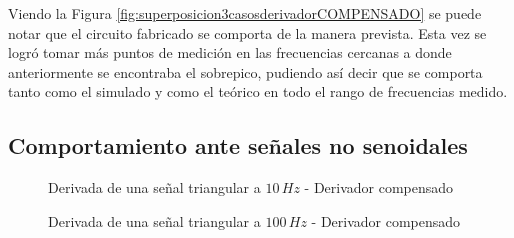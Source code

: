 \documentclass[11pt, a4paper]{article}
\begin{document}
Viendo la Figura \ref{fig:superposicion3casosderivadorCOMPENSADO} se puede notar que el circuito fabricado se comporta de la manera prevista. Esta vez se logró tomar más puntos de medición en las frecuencias cercanas a donde anteriormente se encontraba el sobrepico, pudiendo así decir que se comporta tanto como el simulado y como el teórico en todo el rango de frecuencias medido.

\subsection{Comportamiento ante señales no senoidales}

\begin{figure}[H]
	\begin{center}
		\caption{Derivada de una señal triangular a $10 \,Hz$ - Derivador compensado}
		\label{fig:derivtriangCOMP10Hz}
	\end{center}
\end{figure}

\begin{figure}[H]
	\begin{center}
		\caption{Derivada de una señal triangular a $100 \,Hz$ - Derivador compensado}
		\label{fig:derivtriangCOMP100Hz}
	\end{center}
\end{figure}
\end{document}
